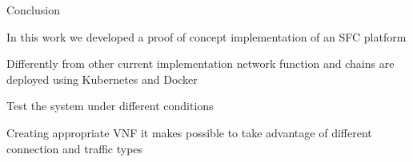 \begin{frame}{Conclusion}

\vfill{}

In this work we developed a proof of concept implementation of an SFC platform

\vfill{}

Differently from other current implementation network function and chains are
deployed using Kubernetes and Docker

\vfill{}

Test the system under different conditions

\vfill{}

Creating appropriate VNF it makes possible to take advantage of different
connection and traffic types

\vfill{}

\end{frame}